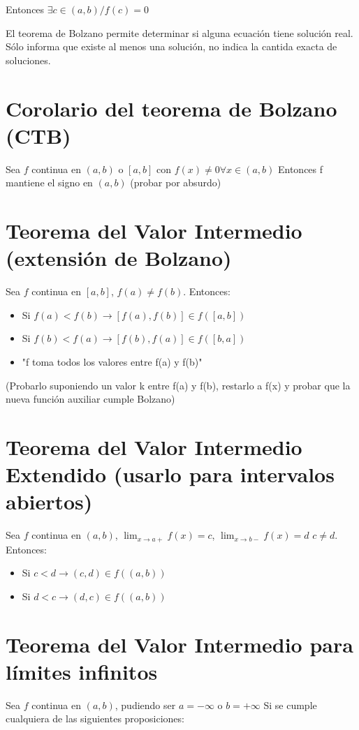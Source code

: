 \documentclass{report}
\begin{document}
		Entonces $\exists c \in (a,b) / f(c) = 0$
		
		El teorema de Bolzano permite determinar si alguna ecuación tiene solución real. Sólo informa que existe al menos una solución, no indica la cantida exacta de soluciones.
		
	\section{Corolario del teorema de Bolzano (CTB)}
		Sea $f$ continua en $(a,b)$ o $[a,b]$ con $f(x) \neq 0 \forall x \in (a,b)$
		Entonces f mantiene el signo en $(a,b)$ (probar por absurdo)
		
	\section{Teorema del Valor Intermedio (extensión de Bolzano)}
		Sea $f$ continua en $[a,b]$, $f(a) \neq f(b)$. Entonces:
		
		\begin{itemize}
			\item Si $f(a) < f(b) \rightarrow [f(a),f(b)] \in f([a,b])$
			\item Si $f(b) < f(a) \rightarrow [f(b),f(a)] \in f([b,a])$
			\item "f toma todos los valores entre f(a) y f(b)"
		\end{itemize}
	
	(Probarlo suponiendo un valor k entre f(a) y f(b), restarlo a f(x) y probar que la nueva función auxiliar cumple Bolzano)
	
	\section{Teorema del Valor Intermedio Extendido (usarlo para intervalos abiertos)}
		Sea $f$ continua en $(a,b)$, $\lim_{x \to a+}f(x)=c$, $\lim_{x \to b-}f(x)=d$ $c \neq d$. Entonces:
	
	\begin{itemize}
		\item Si $c < d \rightarrow (c,d) \in f((a,b))$
		\item Si $d < c \rightarrow (d,c) \in f((a,b))$
	\end{itemize}

	\section{Teorema del Valor Intermedio para límites infinitos}
		Sea $f$ continua en $(a,b)$, pudiendo ser $a=-\infty$ o $b=+\infty$
		Si se cumple cualquiera de las siguientes proposiciones:
	
\end{document}
